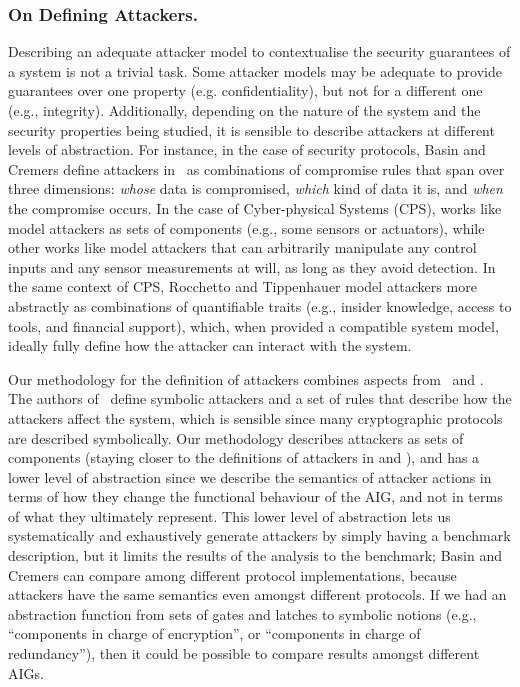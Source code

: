 {\subsubsection{On Defining Attackers.} Describing an adequate attacker model to contextualise the security guarantees of a system is not a trivial task. Some attacker models may be adequate to provide guarantees over one property (e.g. confidentiality), but not for a different one (e.g., integrity). Additionally, depending on the nature of the system and the security properties being studied, it is sensible to describe attackers at different levels of abstraction. For instance, in the case of security protocols, Basin and Cremers define attackers in~\cite{KnowYourEnemy} as combinations of compromise rules that span over three dimensions:  \emph{whose} data is compromised, \emph{which} kind of data it is, and \emph{when} the compromise occurs. In the case of Cyber-physical Systems (CPS), works like \cite{Giraldo2018,Simei} model attackers as sets of components (e.g., some sensors or  actuators), while other works like \cite{IFCPSSec,Cardenas2011,Urbina2016} model attackers that can arbitrarily manipulate any control inputs and any sensor measurements at will, as long as they avoid detection. In the same context of CPS, Rocchetto and Tippenhauer \cite{CPSProfiles} model attackers more abstractly as combinations of quantifiable traits (e.g., insider knowledge, access to tools, and financial support), which, when provided a compatible system model, ideally fully define how the attacker can interact with the system. 

Our methodology for the definition of attackers combines aspects from~\cite{KnowYourEnemy,Giraldo2018} and \cite{Simei}. The authors of~\cite{KnowYourEnemy} define symbolic attackers and a set of rules that describe how the attackers affect the system, which is sensible since many cryptographic protocols are described symbolically. Our methodology describes attackers as sets of components (staying closer to the definitions of attackers in \cite{Giraldo2018} and \cite{Simei}), and has a lower level of abstraction since we describe the semantics of attacker actions in terms of how they change the functional behaviour of the AIG, and not in terms of what they ultimately represent. This lower level of abstraction lets us systematically and exhaustively generate attackers by simply having a benchmark description, but it limits the results of the analysis to the benchmark; Basin and Cremers can compare among different protocol implementations, because attackers have the same semantics even amongst different protocols. If we had an abstraction function from sets of gates and latches to symbolic notions (e.g., ``components in charge of encryption'', or ``components in charge of redundancy''), then it could be possible to compare results amongst different AIGs.

}
